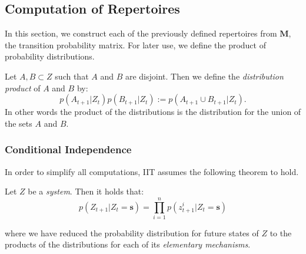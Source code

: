 \subsection{Computation of Repertoires}
\label{sec:cost}
In this section, we construct each of the previously defined repertoires from $\mathbf{M}$, the transition probability matrix. For later use, we define the product of probability distributions.



\begin{definition}
	Let $A, B \subset Z$ such that $A$ and $B$ are disjoint. Then we define the \textit{distribution product} of $A$ and $B$ by:
	\[p(A_{t+1}|Z_t)p(B_{t+1}|Z_t):=p(A_{t+1} \cup B_{t+1}|Z_t).\]
	In other words the product of the distributions is the distribution for the union of the sets $A$ and $B$.
\end{definition} 

\subsubsection{Conditional Independence}
\label{sec:conditional_independence}
In order to simplify all computations, IIT \cite{oizumi2014phenomenology} assumes the following theorem to hold.

\begin{assumption}
	\label{asmp:cond_independence}
	Let $Z$ be a \textit{system}. Then it holds that:
	\begin{equation}
	\label{eq:cond_independence}
	p(Z_{t+1}|Z_t = \mathbf{s}) = \prod \limits_{i=1}^{n} p(z^i_{t+1}|Z_t=\mathbf{s})
	\end{equation}
	
	where we have reduced the probability distribution for future states of $Z$ to the products of the distributions for each of its \textit{elementary mechanisms}. 
\end{assumption}

